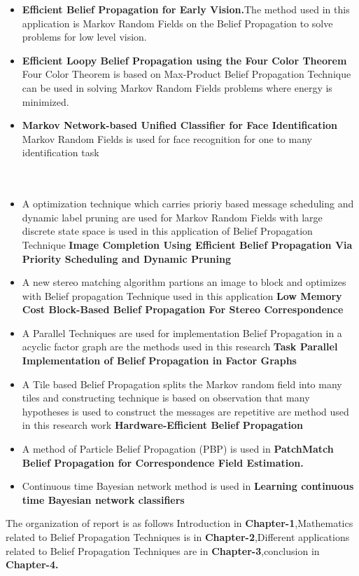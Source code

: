 \begin{itemize}
 \item \textbf{Efficient Belief Propagation for Early Vision.}The method used in this application is Markov Random  Fields on the Belief Propagation to solve problems for low level vision.                                                                 \cite{Pedro}
  
  \item \textbf{Efficient Loopy Belief Propagation using the Four Color Theorem} Four Color Theorem is based on Max-Product Belief Propagation Technique can be used in solving Markov Random  Fields problems where energy is minimized.                     \cite{Radu}
 \item \textbf{Markov Network-based Unified Classifier for Face Identification} Markov Random  Fields is used  for face recognition for one to many identification task                        \cite{Wonjun}
 \\\\\ \item A optimization technique which carries prioriy based message scheduling and dynamic label pruning are used for Markov Random  Fields with large discrete state space is used in this application of Belief Propagation Technique \textbf{Image Completion Using Efficient Belief Propagation Via Priority Scheduling and Dynamic Pruning}           \cite{Nikos}
\item  A new stereo matching algorithm partions an image to block and optimizes with Belief propagation Technique used in this application \textbf{Low Memory Cost Block-Based Belief Propagation For Stereo Correspondence}\cite{yuchang}
   \item A Parallel Techniques are used for implementation Belief Propagation in a acyclic factor graph are the methods used in this research \textbf{ Task Parallel Implementation of Belief Propagation in Factor Graphs}\cite{Nam Ma}
   \item A  Tile based Belief Propagation splits the Markov random field into many tiles and constructing technique is based on observation that many hypotheses is used to construct the messages are repetitive   are method  used in this research work \textbf{Hardware-Efficient Belief Propagation}\cite{Chia-Kailiang}
 \item A method of Particle Belief Propagation (PBP) is used in \textbf{PatchMatch Belief Propagation for
Correspondence Field Estimation.}\cite{besse}


 \item Continuous time  Bayesian network method is used in \textbf{Learning continuous time Bayesian network classifiers}\cite{Daniele}
\end{itemize}
The organization of report is as follows Introduction in \textbf{Chapter-1},Mathematics related to Belief Propagation Techniques is in \textbf{Chapter-2},Different applications related to Belief Propagation Techniques are in \textbf{Chapter-3},conclusion in \textbf{Chapter-4.}












